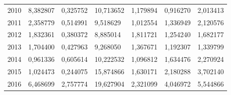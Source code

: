 \begin{table}
\begin{tabular}{p{1cm}p{2cm}p{2cm}p{2cm}p{2cm}p{2cm}p{2cm}}
 2010 &         8,382807 &                                           0,325752 &                                   10,713652 &     1,179894 &          0,916270 &  2,013413 \\
 2011 &         2,358779 &                                           0,514991 &                                    9,518629 &     1,012554 &          1,336949 &  2,120576 \\
 2012 &         1,832361 &                                           0,380372 &                                    8,885014 &     1,811721 &          1,254240 &  1,682177 \\
 2013 &         1,704400 &                                           0,427963 &                                    9,268050 &     1,367671 &          1,192307 &  1,339799 \\
 2014 &         0,961336 &                                           0,605614 &                                   10,222532 &     1,096812 &          1,634476 &  2,270924 \\
 2015 &         1,024473 &                                           0,244075 &                                   15,874866 &     1,630171 &          2,180288 &  3,702140 \\
 2016 &         6,468699 &                                           2,757774 &                                   19,627904 &     2,321099 &          4,046972 &  5,544866 \\
\bottomrule
\end{tabular}
\end{table}
